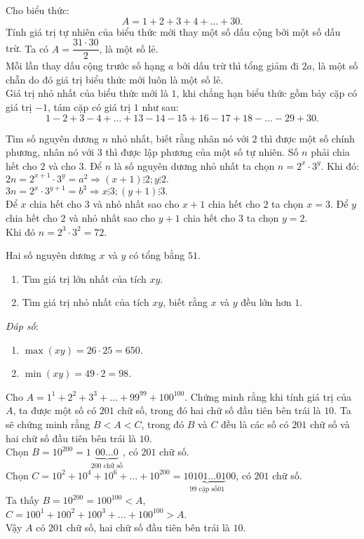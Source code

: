 \begin{bt}
Cho biểu thức:
$$A=1+2+3+4+\ldots+30.$$
Tính giá trị tự nhiên của biểu thức mới thay một số dấu cộng bởi một số dấu trừ.
\loigiai
{
Ta có $A=\dfrac{31\cdot 30}{2}$, là một số lẻ.\\
Mỗi lần thay dấu cộng trước số hạng $a$ bởi dấu trừ thì tổng giảm đi $2a$, là một số chẵn do đó giá trị biểu thức mới luôn là một số lẻ.\\
Giá trị nhỏ nhất của biểu thức mới là $1$, khi chẳng hạn biểu thức gồm bảy cặp có giá trị $-1$, tám cặp có giá trị $1$ như sau:
$$1-2+3-4+\ldots+13-14-15+16-17+18-\ldots-29+30.$$
}
\end{bt}
\begin{bt}
Tìm số nguyên dương $n$ nhỏ nhất, biết rằng nhân nó với $2$ thì được một số chính phương, nhân nó với $3$ thì được lập phương của một số tự nhiên.
\loigiai
{
Số $n$ phải chia hết cho $2$ và cho $3$. Để $n$ là số nguyên dương nhỏ nhất ta chọn $n=2^x\cdot 3^y$. Khi đó:\\
$2n=2^{x+1}\cdot 3^y=a^2\Rightarrow (x+1)\vdots 2; y\vdots 2.$\\
$3n=2^x\cdot 3^{y+1}=b^3\Rightarrow x\vdots 3; (y+1)\vdots 3.$\\
Để $x$ chia hết cho $3$ và nhỏ nhất sao cho $x+1$ chia hết cho $2$ ta chọn $x=3$. Để $y$ chia hết cho $2$ và nhỏ nhất sao cho $y+1$ chia hết cho $3$ ta chọn $y=2$.\\
Khi đó $n=2^3\cdot 3^2=72$.
}
\end{bt}
\begin{bt}
Hai số nguyên dương $x$ và $y$ có tổng bằng $51$.
\begin{enumerate}
  \item Tìm giá trị lớn nhất của tích $xy$.
  \item Tìm giá trị nhỏ nhất của tích $xy$, biết rằng $x$ và $y$ đều lớn hơn $1$.
\end{enumerate}
\loigiai
{\emph{Đáp số}:
\begin{enumerate}
\item $\max (xy)=26\cdot 25=650$.
\item $\min (xy)=49\cdot 2=98$.
\end{enumerate}
}
\end{bt}
\begin{bt}
Cho $A=1^1+2^2+3^3+\ldots+99^{99}+100^{100}$. Chứng minh rằng khi tính giá trị của $A$, ta được một số có $201$ chữ số, trong đó hai chữ số đầu tiên bên trái là $10$.
\loigiai
{
Ta sẽ chứng minh rằng $B<A<C$, trong đó $B$ và $C$ đều là các số có $201$ chữ số và hai chữ số đầu tiên bên trái là $10$.\\
Chọn $B=10^{200}=1\underbrace{00\ldots 0}_{200 \text{ chữ số}}$, có $201$ chữ số.\\
Chọn $C=10^2+10^4+10^6+\ldots +10^{200}=1\underbrace{0101\ldots 01}_{99 \text{ cặp số} 01}00$, có $201$ chữ số.\\
Ta thấy $B=10^{200}=100^{100}<A$,\\
$C=100^1+100^2+100^3+\ldots +100^{100}>A$.\\
Vậy $A$ có $201$ chữ số, hai chữ số đầu tiên bên trái là $10$.
}
\end{bt}
